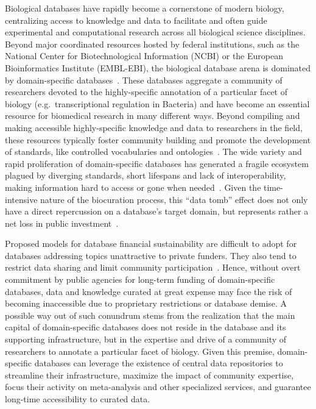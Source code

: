 Biological databases have rapidly become a cornerstone of modern biology,
centralizing access to knowledge and data to facilitate and often guide
experimental and computational research across all biological science
disciplines. Beyond major coordinated resources hosted by federal institutions,
such as the National Center for Biotechnological Information (NCBI) or the
European Bioinformatics Institute (EMBL-EBI), the biological database arena is
dominated by domain-specific databases~\citep{chen2007online,
  chandras2009models, bolser2012metabase, galperin20152015}. These databases
aggregate a community of researchers devoted to the highly-specific annotation
of a particular facet of biology (e.g.\ transcriptional regulation in Bacteria)
and have become an essential resource for biomedical research in many different
ways. Beyond compiling and making accessible highly-specific knowledge and data
to researchers in the field, these resources typically foster community
building and promote the development of standards, like controlled vocabularies
and ontologies~\citep{howe2008big, dunin2006modomics, schindelman2011worm,
  costa2013drosophila}. The wide variety and rapid proliferation of
domain-specific databases has generated a fragile ecosystem plagued by
diverging standards, short lifespans and lack of interoperability, making
information hard to access or gone when needed~\citep{wren2008databases}. Given
the time-intensive nature of the biocuration process, this “data tomb” effect
does not only have a direct repercussion on a database’s target domain, but
represents rather a net loss in public investment~\citep{merali2005databases,
  howe2008big, bastow2010sustainable}.

Proposed models for database financial sustainability are difficult to adopt
for databases addressing topics unattractive to private funders. They also tend
to restrict data sharing and limit community
participation~\citep{chandras2009models, bastow2010sustainable}. Hence, without
overt commitment by public agencies for long-term funding of domain-specific
databases, data and knowledge curated at great expense may face the risk of
becoming inaccessible due to proprietary restrictions or database demise. A
possible way out of such conundrum stems from the realization that the main
capital of domain-specific databases does not reside in the database and its
supporting infrastructure, but in the expertise and drive of a community of
researchers to annotate a particular facet of biology. Given this premise,
domain-specific databases can leverage the existence of central data
repositories to streamline their infrastructure, maximize the impact of
community expertise, focus their activity on meta-analysis and other
specialized services, and guarantee long-time accessibility to curated data.

